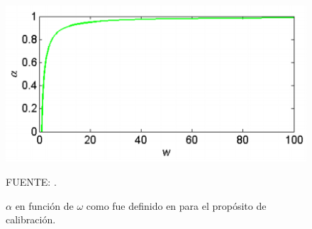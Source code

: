 \begin{figure}[ht]
	\includegraphics[scale=1]{Images/budyko00.png}
	\centering
	\caption{$\alpha$ en función de $\omega$ como fue definido en \citet{Zhang2008} para el propósito de calibración.}
	{\raggedright FUENTE: \citet{Krogh2011}. \par}

	\label{fig:budyko00}
\end{figure}

